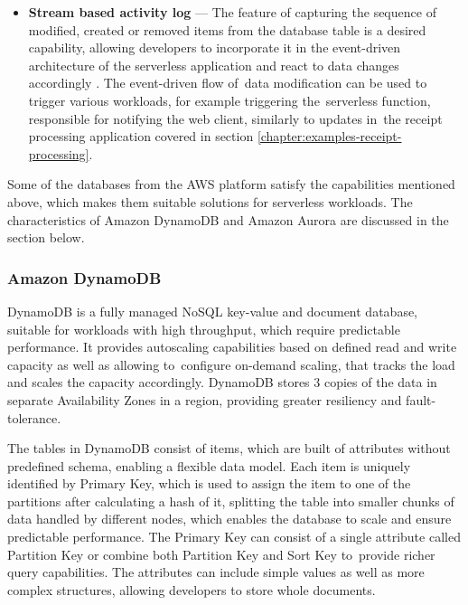 \begin{itemize}
   \item \textbf{Stream based activity log} ---
   The feature of capturing the sequence of modified, created or removed items from the database table is a desired capability, allowing developers to incorporate it in the event-driven architecture of the serverless application and react to data changes accordingly \cite{FauxSQLOrNoSQLExaminingFourDynamoDBPatternsInServerlessApplications}.
   The event-driven flow of~data modification can be used to trigger various workloads, for example triggering the~serverless function, responsible for notifying the web client, similarly to updates in~the receipt processing application covered in section \ref{chapter:examples-receipt-processing}.
\end{itemize}

Some of the databases from the AWS platform satisfy the capabilities mentioned above, which makes them suitable solutions for serverless workloads.
The characteristics of Amazon DynamoDB and Amazon Aurora are discussed in the section below.

\subsubsection{Amazon DynamoDB}

DynamoDB \cite{DynamoDB} is a fully managed NoSQL key-value and document database, suitable for workloads with high throughput, which require predictable performance.
It provides autoscaling capabilities based on defined read and write capacity as well as allowing to~configure on-demand scaling, that tracks the load and scales the capacity accordingly.
DynamoDB stores 3 copies of the data in separate Availability Zones in a region, providing greater resiliency and fault-tolerance.

The tables in DynamoDB consist of items, which are built of attributes without predefined schema, enabling a flexible data model.
Each item is uniquely identified by Primary Key, which is used to assign the item to one of the partitions after calculating a hash of it, splitting the table into smaller chunks of data handled by different nodes, which enables the database to scale and ensure predictable performance.
The Primary Key can consist of a single attribute called Partition Key or combine both Partition Key and Sort Key to~provide richer query capabilities.
The attributes can include simple values as well as more complex structures, allowing developers to store whole documents.

